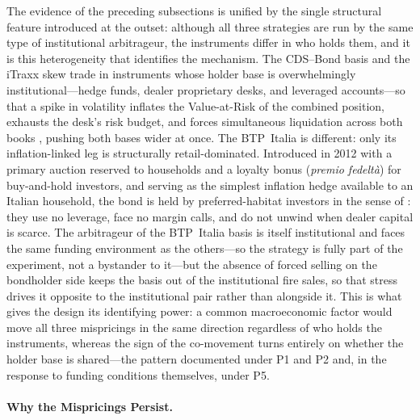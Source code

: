 The evidence of the preceding subsections is unified by the single
structural feature introduced at the outset: although all three
strategies are run by the same type of institutional arbitrageur, the
instruments differ in who holds them, and it is this heterogeneity that
identifies the mechanism. The CDS--Bond basis and the iTraxx skew trade
in instruments whose holder base is overwhelmingly
institutional---hedge funds, dealer proprietary desks, and leveraged
accounts---so that a spike in volatility inflates the Value-at-Risk of
the combined position, exhausts the desk's risk budget, and forces
simultaneous liquidation across both books \citep{brunnermeier2009market},
pushing both bases wider at once. The BTP~Italia is different: only its
inflation-linked leg is structurally retail-dominated. Introduced in
2012 with a primary auction reserved to households and a loyalty bonus
(\textit{premio fedelt\`{a}}) for buy-and-hold investors, and serving
as the simplest inflation hedge available to an Italian household, the
bond is held by preferred-habitat investors in the sense of
\citet{vayanos2021preferred}: they use no leverage, face no margin
calls, and do not unwind when dealer capital is scarce. The arbitrageur
of the BTP~Italia basis is itself institutional and faces the same
funding environment as the others---so the strategy is fully part of
the experiment, not a bystander to it---but the absence of forced
selling on the bondholder side keeps the basis out of the institutional
fire sales, so that stress drives it opposite to the institutional pair
rather than alongside it. This is what gives the design its identifying
power: a common macroeconomic factor would move all three mispricings
in the same direction regardless of who holds the instruments, whereas
the sign of the co-movement turns entirely on whether the holder base
is shared---the pattern documented under P1 and P2 and, in the response
to funding conditions themselves, under P5.

\paragraph{Why the Mispricings Persist.}

